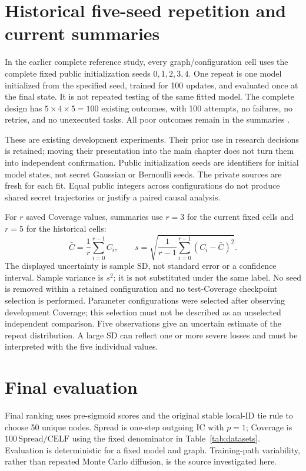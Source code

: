 \section{Historical five-seed repetition and current summaries}
In the earlier complete reference study, every graph/configuration cell uses the complete fixed public initialization seeds $0,1,2,3,4$. One repeat is one model initialized from the specified seed, trained for 100 updates, and evaluated once at the final state. It is not repeated testing of the same fitted model. The complete design has $5\times4\times5=100$ existing outcomes, with 100 attempts, no failures, no retries, and no unexecuted tasks. All poor outcomes remain in the summaries \cite{projectdev}.

These are existing development experiments. Their prior use in research decisions is retained; moving their presentation into the main chapter does not turn them into independent confirmation. Public initialization seeds are identifiers for initial model states, not secret Gaussian or Bernoulli seeds. The private sources are fresh for each fit. Equal public integers across configurations do not produce shared secret trajectories or justify a paired causal analysis.

For $r$ saved Coverage values, summaries use $r=3$ for the current fixed cells and $r=5$ for the historical cells:
\begin{equation}
 \bar C=\frac{1}{r}\sum_{i=0}^{r-1}C_i,\qquad
 s=\sqrt{\frac{1}{r-1}\sum_{i=0}^{r-1}(C_i-\bar C)^2}.\label{eq:fiveseed}
\end{equation}
The displayed uncertainty is sample SD, not standard error or a confidence interval. Sample variance is $s^2$; it is not substituted under the same label. No seed is removed within a retained configuration and no test-Coverage checkpoint selection is performed. Parameter configurations were selected after observing development Coverage; this selection must not be described as an unselected independent comparison. Five observations give an uncertain estimate of the repeat distribution. A large SD can reflect one or more severe losses and must be interpreted with the five individual values.

\section{Final evaluation}
Final ranking uses pre-sigmoid scores and the original stable local-ID tie rule to choose 50 unique nodes. Spread is one-step outgoing IC with $p=1$; Coverage is $100\,\mathrm{Spread}/\mathrm{CELF}$ using the fixed denominator in Table~\ref{tab:datasets}. Evaluation is deterministic for a fixed model and graph. Training-path variability, rather than repeated Monte Carlo diffusion, is the source investigated here.


